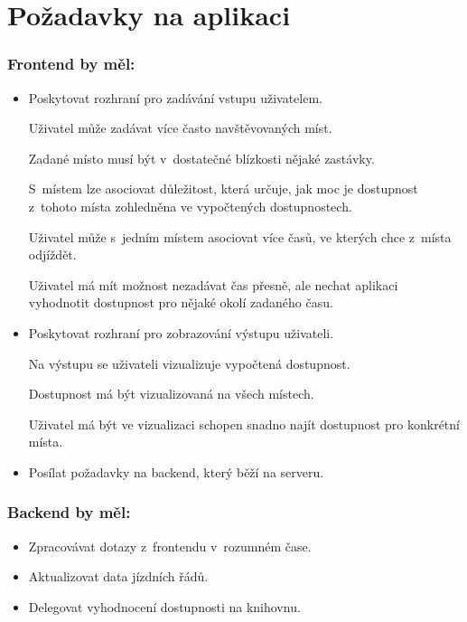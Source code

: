 \section{Požadavky na aplikaci}

\subsubsection{Frontend by měl:}
\begin{itemize}
    \item Poskytovat rozhraní pro zadávání vstupu uživatelem.
    
    Uživatel může zadávat více často navštěvovaných míst.
    
    Zadané místo musí být v~dostatečné blízkosti nějaké zastávky.
    
    S~místem lze asociovat důležitost, která určuje, jak moc je dostupnost z~tohoto místa zohledněna ve vypočtených dostupnostech.
    
    Uživatel může s~jedním místem asociovat více časů, ve kterých chce z~místa odjíždět.
    
    Uživatel má mít možnost nezadávat čas přesně, ale nechat aplikaci vyhodnotit dostupnost pro nějaké okolí zadaného času.
    
    \item Poskytovat rozhraní pro zobrazování výstupu uživateli.
    
    Na výstupu se uživateli vizualizuje vypočtená dostupnost.
    
    Dostupnost má být vizualizovaná na všech místech.
    
    Uživatel má být ve vizualizaci schopen snadno najít dostupnost pro konkrétní místa.
    
    \item Posílat požadavky na backend, který běží na serveru.
\end{itemize}

\subsubsection{Backend by měl:}
\begin{itemize}
    \item Zpracovávat dotazy z~frontendu v~rozumném čase. %
    
    \item Aktualizovat data jízdních řádů.
    
    \item Delegovat vyhodnocení dostupnosti na knihovnu.
\end{itemize}

